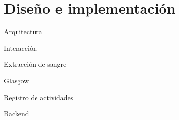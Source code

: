 \section{Diseño e implementación}

\begin{frame}{Arquitectura}\end{frame}
\begin{frame}{Interacción}\end{frame}
\begin{frame}{Extracción de sangre}\end{frame}
\begin{frame}{Glasgow}\end{frame}
\begin{frame}{Registro de actividades}\end{frame}
\begin{frame}{Backend}\end{frame}




